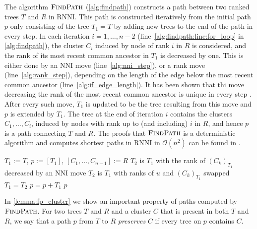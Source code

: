 \documentclass[11pt]{amsart}
\newcommand{\rnni}{\mathrm{RNNI}}
\newcommand{\findpath}{\textsc{FindPath}}
\newcommand{\rank}{\mathrm{rank}}
\newcommand{\nni}{\mathrm{NNI}}
\renewcommand{\O}{\mathcal O}
\newcommand{\summary}[1]{} %
\begin{document}
\summary{Explain $\findpath$ in $\rnni$}
The algorithm $\findpath$ (\autoref{alg:findpath}) constructs a path between two ranked trees $T$ and $R$ in $\rnni$.
This path is constructed iteratively from the initial path $p$ only consisting of the tree $T_1 = T$ by adding new trees to the end of the path in every step.
In each iteration $i = 1, \ldots, n-2$ (line~\ref{alg:findpath:line:for_loop} in \autoref{alg:findpath}), the cluster $C_i$ induced by node of rank $i$ in $R$ is considered, and the rank of its most recent common ancestor in $T_1$ is decreased by one.
This is either done by an $\nni$ move (line~\ref{alg:nni_step}), or a rank move (line~\ref{alg:rank_step}), depending on the length of the edge below the most recent common ancestor (line~\ref{alg:if_edge_length}).
It has been shown that thi move decreasing the rank of the most recent common ancestor is unique in every step \autocite[Proposition 1]{Collienne2021}.
After every such move, $T_1$ is updated to be the tree resulting from this move and $p$ is extended by $T_1$.
The tree at the end of iteration $i$ contains the clusters $C_1, \ldots, C_i$, induced by nodes with rank up to (and including) $i$ in $R$, and hence $p$ is a path connecting $T$ and $R$.
The proofs that $\findpath$ is a deterministic algorithm and computes shortest paths in $\rnni$ in $\O(n^2)$ can be found in \autocite{Collienne2021}.

\begin{algorithm}[ht]
	\caption{$\findpath$($T,R$)}
	\label{alg:findpath}
	\begin{algorithmic}[1]
	\STATE $T_1 := T$, $p := [T_1]$, $[C_1, \ldots, C_{n-1}] := R$
	\label{alg:findpath:line:for_loop}
		\WHILE {$\rank((C_k)_{T_1})>k$}
		\label{alg:findpath:line:while_loop}
				\label{alg:if_edge_length}
				\STATE $T_2$ is $T_1$ with the rank of $(C_k)_{T_1}$ decreased by an $\nni$ move
				\label{alg:nni_step}
			\ELSE
				\STATE $T_2$ is $T_1$ with ranks of $u$ and $(C_k)_{T_1}$ swapped
				\label{alg:rank_step}
			\ENDIF
			\STATE $T_1 = T_2$
			\STATE $p = p+T_1$
		\ENDWHILE
	\ENDFOR
	\RETURN $p$
	\end{algorithmic}
\end{algorithm}

In \autoref{lemma:fp_cluster} we show an important property of paths computed by $\findpath$.
For two trees $T$ and $R$ and a cluster $C$ that is present in both $T$ and $R$, we say that a path $p$ from $T$ to $R$ \emph{preserves} $C$ if every tree on $p$ contains $C$.
\end{document}
